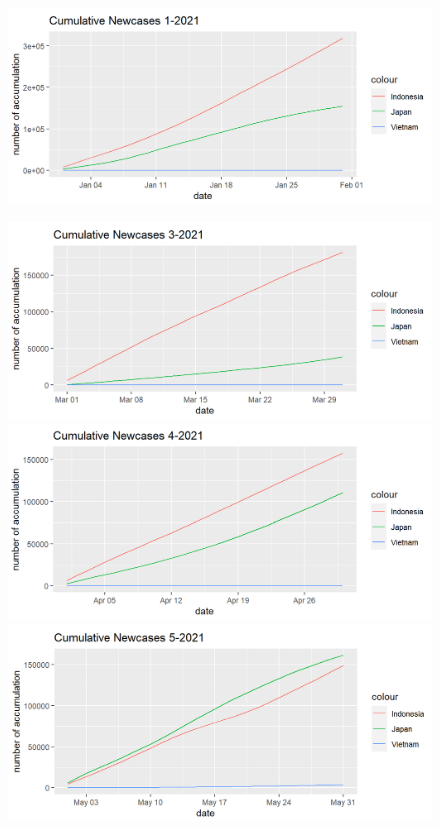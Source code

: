 \documentclass[a4paper]{article}
\theoremstyle{definition}
\begin{document}
\begin{enumerate}[1)]
\begin{figure}[H]
\begin{center}
    		\includegraphics[scale=0.5]{vi/cml_nc_1_2021}
	    \end{center}
	\end{figure}
	
	\begin{figure}[H]
	    \begin{center}
    		\includegraphics[scale=0.5]{vi/cml_nc_3_2021}
    		\includegraphics[scale=0.5]{vi/cml_nc_4_2021}
    		\includegraphics[scale=0.5]{vi/cml_nc_5_2021}

\end{center}
\end{figure}
\end{enumerate}
\end{document}

